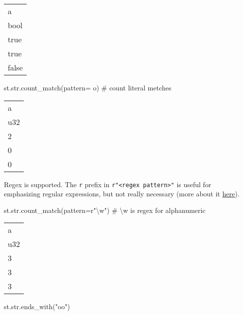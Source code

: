 \documentclass[
  letterpaper,
  DIV=11,
  numbers=noendperiod]{scrartcl}
\newenvironment{Shaded}{\begin{snugshade}}{\end{snugshade}}
\newcommand{\BuiltInTok}[1]{\textcolor[rgb]{0.00,0.23,0.31}{#1}}
\newcommand{\CommentTok}[1]{\textcolor[rgb]{0.37,0.37,0.37}{#1}}
\newcommand{\NormalTok}[1]{\textcolor[rgb]{0.00,0.23,0.31}{#1}}
\newcommand{\OperatorTok}[1]{\textcolor[rgb]{0.37,0.37,0.37}{#1}}
\newcommand{\StringTok}[1]{\textcolor[rgb]{0.13,0.47,0.30}{#1}}
\newcommand{\VerbatimStringTok}[1]{\textcolor[rgb]{0.13,0.47,0.30}{#1}}
\begin{document}
\begin{longtable}[]{@{}l@{}}
\toprule()
a \\
bool \\
\midrule()
\endhead
true \\
true \\
false \\
\bottomrule()
\end{longtable}

\begin{Shaded}
\begin{Highlighting}[]
\NormalTok{st.}\BuiltInTok{str}\NormalTok{.count\_match(pattern}\OperatorTok{=} \StringTok{\textquotesingle{}o\textquotesingle{}}\NormalTok{) }\CommentTok{\# count literal metches}
\end{Highlighting}
\end{Shaded}

\begin{longtable}[]{@{}l@{}}
\toprule()
a \\
u32 \\
\midrule()
\endhead
2 \\
0 \\
0 \\
\bottomrule()
\end{longtable}

Regex is supported. The \texttt{r} prefix in
\texttt{r"\textless{}regex\ pattern\textgreater{}"} is useful for
emphasizing regular expressions, but not really necessary (more about it
\href{https://stackoverflow.com/questions/2241600/python-regex-r-prefix}{here}).

\begin{Shaded}
\begin{Highlighting}[]
\NormalTok{st.}\BuiltInTok{str}\NormalTok{.count\_match(pattern}\OperatorTok{=}\VerbatimStringTok{r"\textbackslash{}w"}\NormalTok{) }\CommentTok{\# \textbackslash{}w is regex for alphanumeric}
\end{Highlighting}
\end{Shaded}

\begin{longtable}[]{@{}l@{}}
\toprule()
a \\
u32 \\
\midrule()
\endhead
3 \\
3 \\
3 \\
\bottomrule()
\end{longtable}

\begin{Shaded}
\begin{Highlighting}[]
\NormalTok{st.}\BuiltInTok{str}\NormalTok{.ends\_with(}\StringTok{"oo"}\NormalTok{)}
\end{Highlighting}
\end{Shaded}
\end{document}
